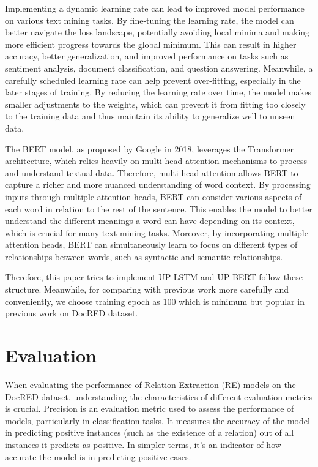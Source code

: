 \documentclass[conference]{IEEEtran}
\begin{document}
Implementing a dynamic learning rate can lead to improved model performance on various text mining tasks. By fine-tuning the learning rate, the model can better navigate the loss landscape, potentially avoiding local minima and making more efficient progress towards the global minimum. This can result in higher accuracy, better generalization, and improved performance on tasks such as sentiment analysis, document classification, and question answering. Meanwhile, a carefully scheduled learning rate can help prevent over-fitting, especially in the later stages of training. By reducing the learning rate over time, the model makes smaller adjustments to the weights, which can prevent it from fitting too closely to the training data and thus maintain its ability to generalize well to unseen data.

The BERT model, as proposed by Google in 2018, leverages the Transformer architecture, which relies heavily on multi-head attention mechanisms to process and understand textual data\cite{elsahar2018t}. Therefore, multi-head attention allows BERT to capture a richer and more nuanced understanding of word context. By processing inputs through multiple attention heads, BERT can consider various aspects of each word in relation to the rest of the sentence. This enables the model to better understand the different meanings a word can have depending on its context, which is crucial for many text mining tasks. Moreover, by incorporating multiple attention heads, BERT can simultaneously learn to focus on different types of relationships between words, such as syntactic and semantic relationships.

 Therefore, this paper tries to implement UP-LSTM and UP-BERT follow these structure. Meanwhile, for comparing with previous work more carefully and conveniently, we choose training epoch as 100 which is minimum but popular in previous work on DocRED dataset.

\section{Evaluation}
When evaluating the performance of Relation Extraction (RE) models on the DocRED dataset, understanding the characteristics of different evaluation metrics is crucial. \cite{WangHong2019FBfD}
Precision is an evaluation metric used to assess the performance of models, particularly in classification tasks. It measures the accuracy of the model in predicting positive instances (such as the existence of a relation) out of all instances it predicts as positive. In simpler terms, it's an indicator of how accurate the model is in predicting positive cases.\cite{alma992984185801101631}
\end{document}
